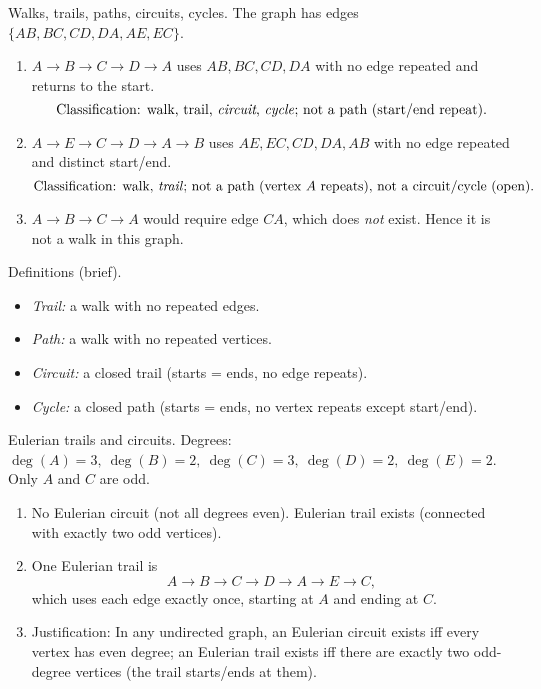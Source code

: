 \documentclass[11pt]{article}
\def\textbf#1{#1}%
\begin{document}
\begin{solution}
\textbf{Walks, trails, paths, circuits, cycles.}
The graph has edges $\{AB,BC,CD,DA,AE,EC\}$.

\begin{center}
\end{center}

\begin{enumerate}
  \item $A\!\to\!B\!\to\!C\!\to\!D\!\to\!A$ uses $AB,BC,CD,DA$ with no edge repeated and returns to the start.
  \[
  \text{Classification: walk, trail, \emph{circuit}, \emph{cycle}; not a path (start/end repeat).}
  \]
  \item $A\!\to\!E\!\to\!C\!\to\!D\!\to\!A\!\to\!B$ uses $AE,EC,CD,DA,AB$ with no edge repeated and distinct start/end.
  \[
  \text{Classification: walk, \emph{trail}; not a path (vertex $A$ repeats), not a circuit/cycle (open).}
  \]
  \item $A\!\to\!B\!\to\!C\!\to\!A$ would require edge $CA$, which does \emph{not} exist. Hence it is not a walk in this graph.
\end{enumerate}

\medskip
\textbf{Definitions (brief).}
\begin{itemize}
  \item \emph{Trail:} a walk with no repeated edges.
  \item \emph{Path:} a walk with no repeated vertices.
  \item \emph{Circuit:} a closed trail (starts = ends, no edge repeats).
  \item \emph{Cycle:} a closed path (starts = ends, no vertex repeats except start/end).
\end{itemize}
\end{solution}

\begin{solution}
\textbf{Eulerian trails and circuits.}
Degrees: $\deg(A)=3,\ \deg(B)=2,\ \deg(C)=3,\ \deg(D)=2,\ \deg(E)=2$.
Only $A$ and $C$ are odd.

\begin{enumerate}
  \item \textbf{No Eulerian circuit} (not all degrees even). \textbf{Eulerian trail exists} (connected with exactly two odd vertices).
  \item One Eulerian trail is
  \[
    A\to B\to C\to D\to A\to E\to C,
  \]
  which uses each edge exactly once, starting at $A$ and ending at $C$.
  \item Justification: In any undirected graph, an Eulerian circuit exists iff every vertex has even degree; an Eulerian trail exists iff there are exactly two odd-degree vertices (the trail starts/ends at them).
\end{enumerate}
\end{solution}
\end{document}
